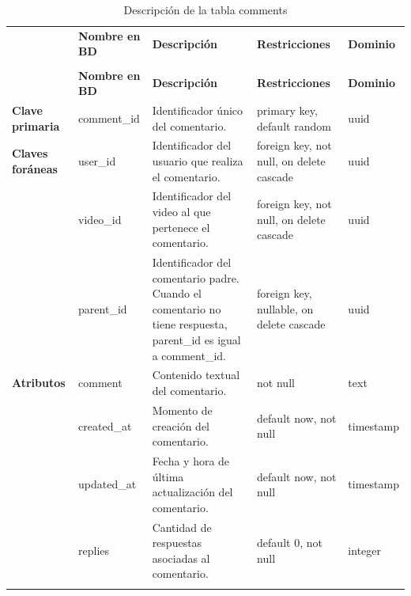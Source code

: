 
\renewcommand{\arraystretch}{1.35}
\setlength{\tabcolsep}{3pt}
\small

\begin{longtable}{|
>{\raggedright\arraybackslash}p{1.9cm}|
>{\raggedright\arraybackslash}p{2.7cm}|
>{\raggedright\arraybackslash}p{4.9cm}|
>{\raggedright\arraybackslash}p{2.7cm}|
>{\raggedright\arraybackslash}p{2.1cm}|
}
\hline

\rowcolor[gray]{0.75}
\multicolumn{5}{|c|}{\textbf{Comentarios}} \\
\hline

 & \textbf{Nombre en BD} & \textbf{Descripción} & \textbf{Restricciones} & \textbf{Dominio} \\
\hline
\endfirsthead

\hline
\rowcolor[gray]{0.75}
\multicolumn{5}{|c|}{\textbf{Comentarios}} \\
\hline

 & \textbf{Nombre en BD} & \textbf{Descripción} & \textbf{Restricciones} & \textbf{Dominio} \\
\hline
\endhead

\textbf{Clave primaria}
& comment\_\allowbreak id
& Identificador único del comentario.
& primary key, default random
& uuid \\
\hline

\textbf{Claves foráneas}
& user\_\allowbreak id
& Identificador del usuario que realiza el comentario.
& foreign key, not null, on delete cascade
& uuid \\
\cline{2-5}

& video\_\allowbreak id
& Identificador del video al que pertenece el comentario.
& foreign key, not null, on delete cascade
& uuid \\
\cline{2-5}

& parent\_\allowbreak id
& Identificador del comentario padre. Cuando el comentario no tiene respuesta, parent\_id es igual a comment\_id.
& foreign key, nullable, on delete cascade
& uuid \\
\hline

\textbf{Atributos}
& comment
& Contenido textual del comentario.
& not null
& text \\
\cline{2-5}

& created\_\allowbreak at
& Momento de creación del comentario.
& default now, not null
& timestamp \\
\cline{2-5}

& updated\_\allowbreak at
& Fecha y hora de última actualización del comentario.
& default now, not null
& timestamp \\
\cline{2-5}

& replies
& Cantidad de respuestas asociadas al comentario.
& default 0, not null
& integer \\
\hline

\caption{Descripción de la tabla comments}
\end{longtable}


